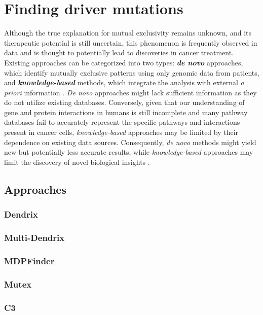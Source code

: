 \chapter{Finding driver mutations} \label{chap:finding_driver_mutations}

Although the true explanation for mutual exclusivity remains unknown, and its therapeutic potential is still uncertain, this phenomenon is frequently observed in data and is thought to potentially lead to discoveries in cancer treatment. Existing approaches can be categorized into two types: \textbf{\textit{de novo}} approaches, which identify mutually exclusive patterns using only genomic data from patients, and \textbf{\textit{knowledge-based}} methods, which integrate the analysis with external \textit{a priori} information \cite{survey}. \textit{De novo} approaches might lack sufficient information as they do not utilize existing databases. Conversely, given that our understanding of gene and protein interactions in humans is still incomplete and many pathway databases fail to accurately represent the specific pathways and interactions present in cancer cells, \textit{knowledge-based} approaches may be limited by their dependence on existing data sources. Consequently, \textit{de novo} methods might yield new but potentially less accurate results, while \textit{knowledge-based} approaches may limit the discovery of novel biological insights \cite{multi-dendrix}.

\section{Approaches}

\subsection{Dendrix}


\subsection{Multi-Dendrix}

\subsection{MDPFinder}

\subsection{Mutex}

\subsection{C3}

\cleardoublepage

